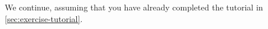 


We continue, assuming that you have already completed the tutorial in \cref{sec:exercise-tutorial}.
